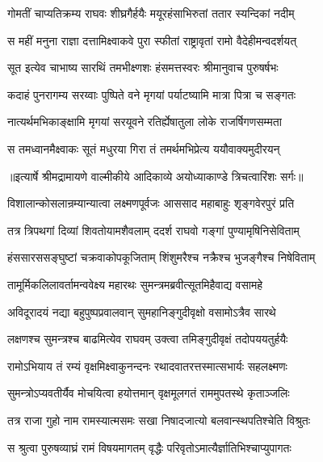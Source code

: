 \twolineshloka
{गोमतीं चाप्यतिक्रम्य राघवः शीघ्रगैर्हयैः}
{मयूरहंसाभिरुतां ततार स्यन्दिकां नदीम्} %

\twolineshloka
{स महीं मनुना राज्ञा दत्तामिक्ष्वाकवे पुरा}
{स्फीतां राष्ट्रावृतां रामो वैदेहीमन्वदर्शयत्} %

\twolineshloka
{सूत इत्येव चाभाष्य सारथिं तमभीक्ष्णशः}
{हंसमत्तस्वरः श्रीमानुवाच पुरुषर्षभः} %

\twolineshloka
{कदाहं पुनरागम्य सरय्वाः पुष्पिते वने}
{मृगयां पर्याटष्यामि मात्रा पित्रा च सङ्गतः} %

\twolineshloka
{नात्यर्थमभिकाङ्क्षामि मृगयां सरयूवने}
{रतिर्ह्येषातुला लोके राजर्षिगणसम्मता} %

\twolineshloka
{स तमध्वानमैक्ष्वाकः सूतं मधुरया गिरा}
{तं तमर्थमभिप्रेत्य ययौवाक्यमुदीरयन्} %


{॥इत्यार्षे श्रीमद्रामायणे वाल्मीकीये आदिकाव्ये अयोध्याकाण्डे त्रिचत्वारिंशः सर्गः॥}


\twolineshloka
{विशालान्कोसलान्रम्यान्यात्वा लक्ष्मणपूर्वजः}
{आससाद महाबाहुः शृङ्गवेरपुरं प्रति} %

\twolineshloka
{तत्र त्रिपथगां दिव्यां शिवतोयामशैवलाम्}
{ददर्श राघवो गङ्गां पुण्यामृषिनिसेविताम्} %

\twolineshloka
{हंससारससङ्घुष्टां चक्रवाकोपकूजिताम्}
{शिंशुमरैश्च नक्रैश्च भुजङ्गैश्च निषेविताम्} %

\twolineshloka
{तामूर्मिकलिलावर्तामन्ववेक्ष्य महारथः}
{सुमन्त्रमब्रवीत्सूतमिहैवाद्य वसामहे} %

\twolineshloka
{अविदूरादयं नद्या बहुपुष्पप्रवालवान्}
{सुमहानिङ्गुदीवृक्षो वसामोऽत्रैव सारथे} %

\twolineshloka
{लक्षणश्च सुमन्त्रश्च बाढमित्येव राघवम्}
{उक्त्वा तमिङ्गुदीवृक्षं तदोपययतुर्हयैः} %

\twolineshloka
{रामोऽभियाय तं रम्यं वृक्षमिक्ष्वाकुनन्दनः}
{रथादवातरत्तस्मात्सभार्यः सहलक्ष्मणः} %

\twolineshloka
{सुमन्त्रोऽप्यवतीर्यैव मोचयित्वा हयोत्तमान्}
{वृक्षमूलगतं राममुपतस्थे कृताञ्जलिः} %

\twolineshloka
{तत्र राजा गुहो नाम रामस्यात्मसमः सखा}
{निषादजात्यो बलवान्स्थपतिश्चेति विश्रुतः} %

\twolineshloka
{स श्रुत्वा पुरुषव्याघ्रं रामं विषयमागतम्}
{वृद्धैः परिवृतोऽमात्यैर्ज्ञातिभिश्चाप्युपागतः} %

